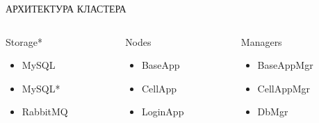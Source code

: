 \documentclass[aspectratio=169]{beamer}
\begin{document}
\begin{frame}{АРХИТЕКТУРА КЛАСТЕРА}
    \begin{columns}

    \begin{column}{0.33\textwidth}
    \begin{block}{Storage*}
        \begin{itemize}
            \item MySQL
            \item MySQL*
            \item RabbitMQ
        \end{itemize}
    \end{block}
    \end{column}

    \begin{column}{0.33\textwidth}
    \begin{block}{Nodes}
        \begin{itemize}
            \item BaseApp
            \item CellApp
            \item LoginApp
        \end{itemize}
    \end{block}
    \end{column}

    \begin{column}{0.33\textwidth}
    \begin{block}{Managers}
        \begin{itemize}
            \item BaseAppMgr
            \item CellAppMgr
            \item DbMgr
        \end{itemize}
    \end{block}
    \end{column}

    \end{columns}
    \vspace*{1cm}
\end{frame}
\end{document}
